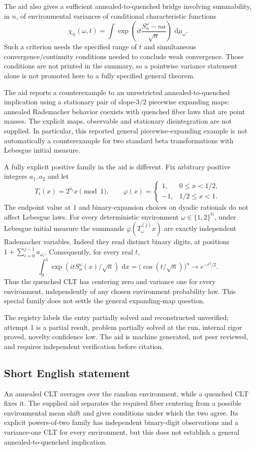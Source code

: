 \documentclass[11pt]{article}
\newcommand{\N}{\mathbb{N}}
\newcommand{\dd}{\,\mathrm{d}}
\begin{document}
The aid also gives a sufficient annealed-to-quenched bridge involving summability, in \(n\), of environmental variances of conditional characteristic functions
\[
\chi_n(\omega,t)=\int\exp\left(it\frac{S_n^\omega-na}{\sqrt n}\right)\,\dd\mu_\omega.
\]
Such a criterion needs the specified range of \(t\) and simultaneous convergence/continuity conditions needed to conclude weak convergence. Those conditions are not printed in the summary, so a pointwise variance statement alone is not promoted here to a fully specified general theorem.

The aid reports a counterexample to an unrestricted annealed-to-quenched implication using a stationary pair of slope-\(3/2\) piecewise expanding maps: annealed Rademacher behavior coexists with quenched fiber laws that are point masses. The explicit maps, observable and stationary disintegration are not supplied. In particular, this reported general piecewise-expanding example is not automatically a counterexample for two standard beta transformations with Lebesgue initial measure.

A fully explicit positive family in the aid is different. Fix arbitrary positive integers \(a_1,a_2\) and let
\[
T_i(x)=2^{a_i}x\pmod1,\qquad
\varphi(x)=\begin{cases}1,&0\le x<1/2,\\-1,&1/2\le x<1.\end{cases}
\]
The endpoint value at 1 and binary-expansion choices on dyadic rationals do not affect Lebesgue laws. For every deterministic environment \(\omega\in\{1,2\}^{\N}\), under Lebesgue initial measure the summands \(\varphi(T_\omega^{(j)}x)\) are exactly independent Rademacher variables. Indeed they read distinct binary digits, at positions \(1+\sum_{i=0}^{j-1}a_{\omega_i}\). Consequently, for every real \(t\),
\[
\int_0^1\exp\left(itS_n^\omega(x)/\sqrt n\right)\,\dd x
=\bigl(\cos(t/\sqrt n)\bigr)^n\longrightarrow e^{-t^2/2}.
\]
Thus the quenched CLT has centering zero and variance one for every environment, independently of any chosen environment probability law. This special family does not settle the general expanding-map question.

The registry labels the entry partially solved and reconstructed unverified; attempt 1 is a partial result, problem partially solved at the run, internal rigor proved, novelty confidence low. The aid is machine generated, not peer reviewed, and requires independent verification before citation.
\subsection{Short English statement}
An annealed CLT averages over the random environment, while a quenched CLT fixes it. The supplied aid separates the required fiber centering from a possible environmental mean shift and gives conditions under which the two agree. Its explicit powers-of-two family has independent binary-digit observations and a variance-one CLT for every environment, but this does not establish a general annealed-to-quenched implication.
\end{document}
